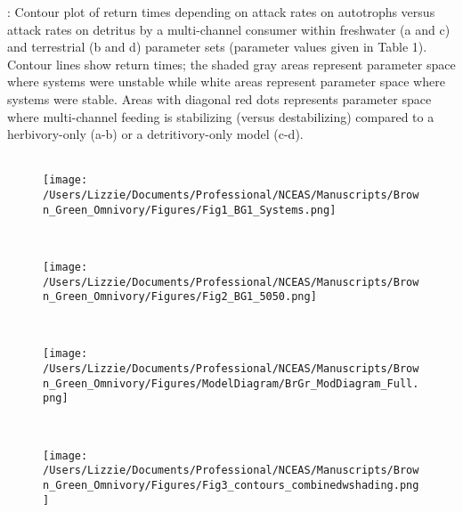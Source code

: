 \documentclass[12pt,a4paper,oneside]{article}
\begin{document}
: Contour plot of return times
 depending on attack rates on autotrophs 
versus attack rates on detritus by a multi-channel consumer within freshwater (a and c)
and terrestrial (b and d) parameter sets (parameter values given in Table 1). 
Contour lines show return times; the shaded gray areas represent parameter space where systems were unstable while white areas represent parameter space where systems were
stable. Areas with diagonal red dots represents parameter space where
multi-channel feeding is stabilizing (versus destabilizing) compared to a herbivory-only (a-b) or a detritivory-only model (c-d).\\

\newpage
{}
\\
\begin{figure}[h!]
\centering
\noindent \texttt{[image: /Users/Lizzie/Documents/Professional/NCEAS/Manuscripts/Brown\_Green\_Omnivory/Figures/Fig1\_BG1\_Systems.png]}
\end{figure}

\newpage
{}
\\
\begin{figure}[h!]
\centering
\noindent \texttt{[image: /Users/Lizzie/Documents/Professional/NCEAS/Manuscripts/Brown\_Green\_Omnivory/Figures/Fig2\_BG1\_5050.png]}
\end{figure}

\newpage
{}
\\
\begin{figure}[h!]
\centering
\noindent \texttt{[image: /Users/Lizzie/Documents/Professional/NCEAS/Manuscripts/Brown\_Green\_Omnivory/Figures/ModelDiagram/BrGr\_ModDiagram\_Full.png]}
\end{figure}

\newpage
{}
\\
\begin{figure}[h!]
\centering
\noindent \texttt{[image: /Users/Lizzie/Documents/Professional/NCEAS/Manuscripts/Brown\_Green\_Omnivory/Figures/Fig3\_contours\_combinedwshading.png]}
\end{figure}
\end{document}
